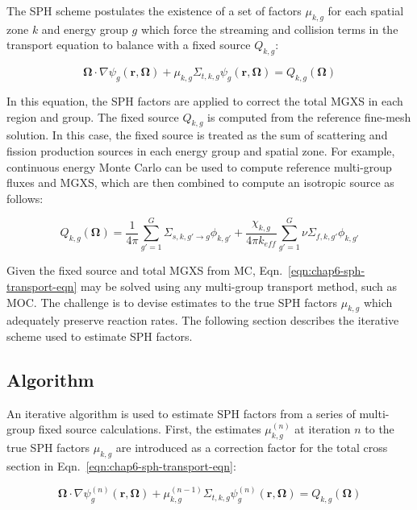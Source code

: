 The \ac{SPH} scheme postulates the existence of a set of factors $\mu_{k,g}$ for each spatial zone $k$ and energy group $g$ which force the streaming and collision terms in the transport equation to balance with a fixed source $Q_{k,g}$:

\begin{dmath}
\label{eqn:chap6-sph-transport-eqn}
\mathbf{\Omega} \cdot \nabla \psi_{g}(\mathbf{r},\mathbf{\Omega}) + \mu_{k,g}\Sigma_{t,k,g}\psi_{g}(\mathbf{r},\mathbf{\Omega}) = Q_{k,g}(\mathbf{\Omega})
\end{dmath}

\noindent In this equation, the \ac{SPH} factors are applied to correct the total \ac{MGXS} in each region and group. The fixed source $Q_{k,g}$ is computed from the reference fine-mesh solution. In this case,  the fixed source is treated as the sum of scattering and fission production sources in each energy group and spatial zone. For example, continuous energy Monte Carlo can be used to compute reference multi-group fluxes and \ac{MGXS}, which are then combined to compute an isotropic source as follows:

\begin{dmath}
\label{eqn:chap6-sph-source}
Q_{k,g}(\mathbf{\Omega}) = \frac{1}{4\pi} \sum_{g'=1}^{G} \Sigma_{s,k,g' \rightarrow g}\phi_{k,g'} + \frac{\chi_{k,g}}{4\pi k_{eff}}\sum_{g'=1}^{G} \nu\Sigma_{f,k,g'}\phi_{k,g'}
\end{dmath}

\noindent Given the fixed source and total \ac{MGXS} from \ac{MC}, Eqn.~\ref{eqn:chap6-sph-transport-eqn} may be solved using any multi-group transport method, such as \ac{MOC}. The challenge is to devise estimates to the true \ac{SPH} factors $\mu_{k,g}$ which adequately preserve reaction rates. The following section describes the iterative scheme used to estimate \ac{SPH} factors.

\subsection{Algorithm}
\label{subsec:chap6-sph-algorithm}

An iterative algorithm is used to estimate \ac{SPH} factors from a series of multi-group fixed source calculations. First, the estimates $\mu_{k,g}^{(n)}$ at iteration $n$ to the true \ac{SPH} factors $\mu_{k,g}$ are introduced as a correction factor for the total cross section in Eqn.~\ref{eqn:chap6-sph-transport-eqn}:

\begin{dmath}
\label{eqn:chap6-sph-transport-eqn-iterate}
\mathbf{\Omega} \cdot \nabla \psi_{g}^{(n)}(\mathbf{r},\mathbf{\Omega}) + \mu_{k,g}^{(n-1)}\Sigma_{t,k,g}\psi_{g}^{(n)}(\mathbf{r},\mathbf{\Omega}) = Q_{k,g}(\mathbf{\Omega})
\end{dmath}

